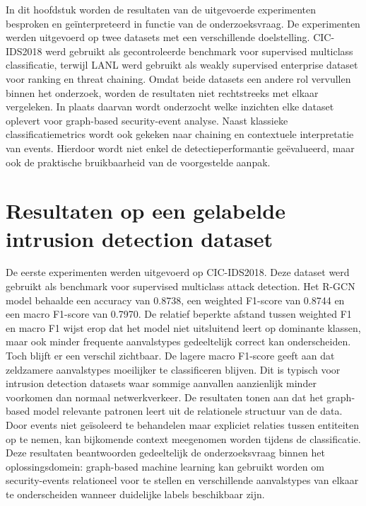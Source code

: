 In dit hoofdstuk worden de resultaten van de uitgevoerde experimenten besproken en geïnterpreteerd in functie van de onderzoeksvraag.
\newline
\newline
De experimenten werden uitgevoerd op twee datasets met een verschillende doelstelling. CIC-IDS2018 werd gebruikt als gecontroleerde benchmark voor supervised multiclass classificatie, terwijl LANL werd gebruikt als weakly supervised enterprise dataset voor ranking en threat chaining.
\newline
\newline
Omdat beide datasets een andere rol vervullen binnen het onderzoek, worden de resultaten niet rechtstreeks met elkaar vergeleken. In plaats daarvan wordt onderzocht welke inzichten elke dataset oplevert voor graph-based security-event analyse.
\newline
\newline
Naast klassieke classificatiemetrics wordt ook gekeken naar chaining en contextuele interpretatie van events. Hierdoor wordt niet enkel de detectieperformantie geëvalueerd, maar ook de praktische bruikbaarheid van de voorgestelde aanpak.

\section{Resultaten op een gelabelde intrusion detection dataset}

De eerste experimenten werden uitgevoerd op CIC-IDS2018. Deze dataset werd gebruikt als benchmark voor supervised multiclass attack detection.
\newline
\newline
Het R-GCN model behaalde een accuracy van 0.8738, een weighted F1-score van 0.8744 en een macro F1-score van 0.7970.
\newline
\newline
De relatief beperkte afstand tussen weighted F1 en macro F1 wijst erop dat het model niet uitsluitend leert op dominante klassen, maar ook minder frequente aanvalstypes gedeeltelijk correct kan onderscheiden.
\newline
\newline
Toch blijft er een verschil zichtbaar. De lagere macro F1-score geeft aan dat zeldzamere aanvalstypes moeilijker te classificeren blijven. Dit is typisch voor intrusion detection datasets waar sommige aanvallen aanzienlijk minder voorkomen dan normaal netwerkverkeer.
\newline
\newline
De resultaten tonen aan dat het graph-based model relevante patronen leert uit de relationele structuur van de data. Door events niet geïsoleerd te behandelen maar expliciet relaties tussen entiteiten op te nemen, kan bijkomende context meegenomen worden tijdens de classificatie.
\newline
\newline
Deze resultaten beantwoorden gedeeltelijk de onderzoeksvraag binnen het oplossingsdomein: graph-based machine learning kan gebruikt worden om security-events relationeel voor te stellen en verschillende aanvalstypes van elkaar te onderscheiden wanneer duidelijke labels beschikbaar zijn.

